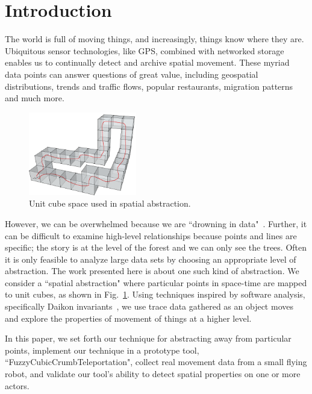 \section{Introduction}

The world is full of moving things, and increasingly, things know where they are. 
Ubiquitous sensor technologies, like GPS, combined with networked storage enables us to continually detect and archive spatial movement.
These myriad data points can answer questions of great value, including geospatial distributions, trends and traffic flows, popular restaurants, migration patterns and much more.

\begin{figure}
  \centering
  \includegraphics[width=0.42\textwidth]{./figures/path_overview}
  \caption{Unit cube space used in spatial abstraction.}
  \label{fig:unitCubes}
\end{figure}

However, we can be overwhelmed because we are ``drowning in data"~\cite{morse1993drowning}.
Further, it can be difficult to examine high-level relationships because points and lines are specific; the story is at the level of the forest and we can only see the trees.  
Often it is only feasible to analyze large data sets by choosing an appropriate level of abstraction.
The work presented here is about one such kind of abstraction.
We consider a ``spatial abstraction" where particular points in space-time are mapped to unit cubes, as shown in Fig.~\ref{fig:unitCubes}.
Using techniques inspired by software analysis, specifically Daikon invariants~\cite{kataoka2001automated}, we use trace data gathered as an object moves and explore the properties of movement of things at a higher level.

In this paper, we set forth our technique for abstracting away from particular points, 
implement our technique in a prototype tool, ``FuzzyCubicCrumbTeleportation", 
collect real movement data from a small flying robot, 
and validate our tool's ability to detect spatial properties on one or more actors.

